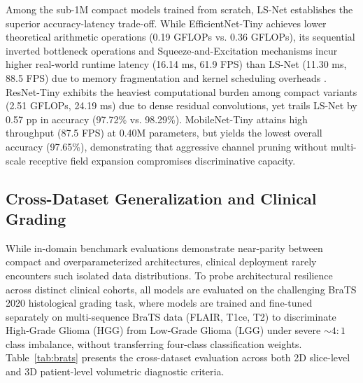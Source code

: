 ﻿\documentclass[journal]{IEEEtran}
\begin{document}
Among the sub-1M compact models trained from scratch, LS-Net establishes the superior accuracy-latency trade-off. While EfficientNet-Tiny achieves lower theoretical arithmetic operations (0.19 GFLOPs vs. 0.36 GFLOPs), its sequential inverted bottleneck operations and Squeeze-and-Excitation mechanisms incur higher real-world runtime latency (16.14 ms, 61.9 FPS) than LS-Net (11.30 ms, 88.5 FPS) due to memory fragmentation and kernel scheduling overheads \cite{32}. ResNet-Tiny exhibits the heaviest computational burden among compact variants (2.51 GFLOPs, 24.19 ms) due to dense residual convolutions, yet trails LS-Net by 0.57 pp in accuracy (97.72\% vs. 98.29\%). MobileNet-Tiny attains high throughput (87.5 FPS) at 0.40M parameters, but yields the lowest overall accuracy (97.65\%), demonstrating that aggressive channel pruning without multi-scale receptive field expansion compromises discriminative capacity.

\subsection{Cross-Dataset Generalization and Clinical Grading}

While in-domain benchmark evaluations demonstrate near-parity between compact and overparameterized architectures, clinical deployment rarely encounters such isolated data distributions. To probe architectural resilience across distinct clinical cohorts, all models are evaluated on the challenging BraTS 2020 histological grading task, where models are trained and fine-tuned separately on multi-sequence BraTS data (FLAIR, T1ce, T2) to discriminate High-Grade Glioma (HGG) from Low-Grade Glioma (LGG) under severe $\sim 4:1$ class imbalance, without transferring four-class classification weights. Table~\ref{tab:brats} presents the cross-dataset evaluation across both 2D slice-level and 3D patient-level volumetric diagnostic criteria.
\end{document}
